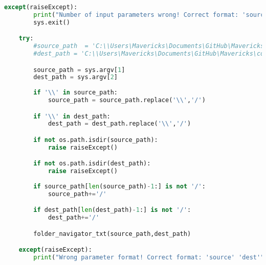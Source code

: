 \begin{lstlisting}[language=Python, caption=txtFileMaker code.]
    except(raiseExcept):
        print("Number of input parameters wrong! Correct format: 'source' 'dest'")
        sys.exit()

    try: 
        #source_path  = 'C:\\Users\Mavericks\Documents\GitHub\Mavericks\coding\PyTests\FolderNavTest\Testing_folder'           //these two could be used instead of sys.argv[1] and sys.argv[2]
        #dest_path = 'C:\\Users\Mavericks\Documents\GitHub\Mavericks\coding\PyTests\FolderNavTest\Results_folder'              // in order to run the code in an IDE or similar 

        source_path = sys.argv[1]
        dest_path = sys.argv[2]
        
        if '\\' in source_path:
            source_path = source_path.replace('\\','/')

        if '\\' in dest_path:
            dest_path = dest_path.replace('\\','/')

        if not os.path.isdir(source_path):
            raise raiseExcept()

        if not os.path.isdir(dest_path):
            raise raiseExcept()
        
        if source_path[len(source_path)-1:] is not '/':
            source_path+='/'

        if dest_path[len(dest_path)-1:] is not '/':
            dest_path+='/'

        folder_navigator_txt(source_path,dest_path)

    except(raiseExcept): 
        print("Wrong parameter format! Correct format: 'source' 'dest'")
\end{lstlisting}








